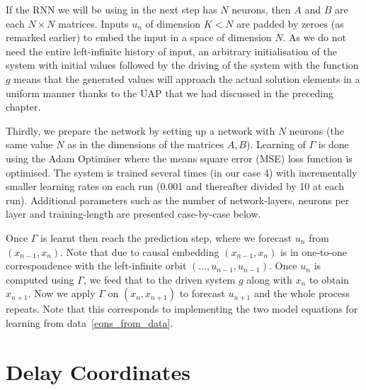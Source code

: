 If the RNN we will be using in the next step has $N$ neurons, then $A$ and $B$ are each $N\times{N}$ matrices. Inputs $u_n$ of dimension $K < N$ are padded by zeroes (as remarked earlier) to embed the input in a space of dimension $N$. As we do not need the entire left-infinite history of input, an arbitrary initialisation of the system with initial values followed by the driving of the system with the function $g$ means that the generated values will approach the actual solution elements in a uniform manner thanks to the UAP that we had discussed in the preceding chapter.

Thirdly, we prepare the network by setting up a network with $N$ neurons (the same value $N$ as in the dimensions of the matrices $A,B$). Learning of $\Gamma$ is done using the Adam Optimiser where the means square error (MSE) loss function is optimised. 
The system is trained several times (in our case 4) with incrementally smaller learning rates on each run (0.001 and thereafter divided by 10 at each run). 
Additional parameters such as the number of network-layers, neurons per layer and training-length are presented case-by-case below.

Once $\Gamma$ is learnt then reach the prediction step, where we forecast $u_n$ from $(x_{n-1},x_{n})$. Note that  due to causal embedding $(x_{n-1},x_{n})$ is in one-to-one correspondence with the left-infinite orbit $(\ldots,u_{n-1},u_{n-1})$. Once $u_n$ is computed using $\Gamma$, we feed that to the driven system $g$ along with  $x_n$ to obtain $x_{n+1}$. Now we apply $\Gamma$ on $(x_n,x_{n+1})$ to forecast $u_{n+1}$ and the whole process repeats. Note that this corresponds to implementing the two model equations for learning from data~\eqref{eqns_from_data}.
    

\section{Delay Coordinates}

